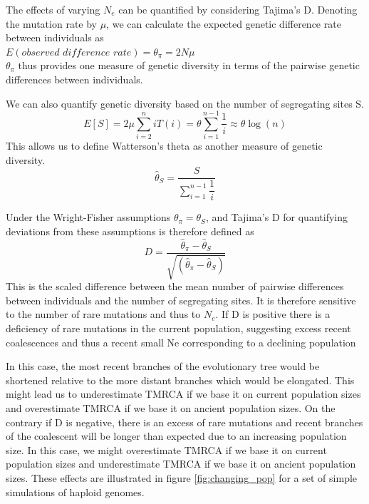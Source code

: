 \documentclass{article}
\begin{document}
The effects of varying $N_e$ can be quantified by considering Tajima's D.
Denoting the mutation rate by $\mu$, we can calculate the expected genetic difference rate between individuals as\\
$E(observed \,\, difference \,\, rate) = \theta_\pi = 2 N \mu$ \\
$\theta_\pi$ thus provides one measure of genetic diversity in terms of the pairwise genetic differences between individuals.

We can also quantify genetic diversity based on the number of segregating sites S.
\begin{equation}
E[S] = 2 \mu \sum_{i=2}^n{iT(i)}  = \theta \sum_{i=1}^{n-1}{\dfrac{1}{i}} \approx \theta \log{(n)}
\end{equation}
This allows us to define Watterson's theta as another measure of genetic diversity.
\begin{equation}
\hat \theta_S = \dfrac{S}{\sum_{i=1}^{n-1}{\dfrac{1}{i}}}
\end{equation}

Under the Wright-Fisher assumptions $\theta_\pi = \theta_S$, and Tajima's D for quantifying deviations from these assumptions is therefore defined as 
\begin{equation}
D = \dfrac{\hat \theta_\pi - \hat \theta_S}{\sqrt{(\hat \theta_\pi - \hat \theta_S)}}
\end{equation}
This is the scaled difference between the mean number of pairwise differences between individuals and the number of segregating sites. It is therefore sensitive to the number of rare mutations and thus to $N_e$.
If D is positive there is a deficiency of rare mutations in the current population, suggesting excess recent coalescences and thus a recent small Ne corresponding to a declining population

In this case, the most recent branches of the evolutionary tree would be shortened relative to the more distant branches which would be elongated. This might lead us to underestimate TMRCA if we base it on current population sizes and overestimate TMRCA if we base it on ancient population sizes. On the contrary if D is negative, there is an excess of rare mutations and recent branches of the coalescent will be longer than expected due to an increasing population size. In this case, we might overestimate TMRCA if we base it on current population sizes and underestimate TMRCA if we base it on ancient population sizes. These effects are illustrated in figure \ref{fig:changing_pop} for a set of simple simulations of haploid genomes.
\end{document}

